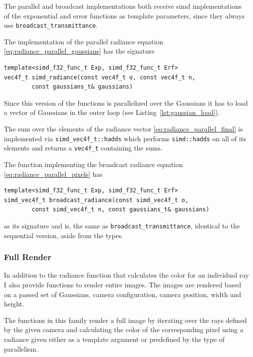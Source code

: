 \documentclass[a4paper, 11pt]{memoir}
\begin{document}
    The parallel and broadcast implementations both receive \gls{simd} implementations of the exponential and error
    functions as template parameters, since they always use \texttt{broadcast_transmittance}.

    The implementation of the parallel \gls{radiance} equation \eqref{eq:radiance_parallel_gaussians} has the signature
    \begin{verbatim}
template<simd_f32_func_t Exp, simd_f32_func_t Erf>
vec4f_t simd_radiance(const vec4f_t o, const vec4f_t n,
        const gaussians_t& gaussians)
    \end{verbatim}
    
    Since this version of the functions is parallelized over the Gaussians it has to load a vector of Gaussians in the
    outer loop (see Listing~\ref{lst:gaussian_load}).

    The sum over the elements of the \gls{radiance} vector \eqref{eq:radiance_parallel_final} is implemented via
    \texttt{simd_vec4f_t::hadds} which performs \texttt{simd::hadds} on all of its elements and returns
    a \texttt{vec4f_t} containing the sums.

    The function implementing the broadcast \gls{radiance} equation \eqref{eq:radiance_parallel_pixels} has
    \begin{verbatim}
template<simd_f32_func_t Exp, simd_f32_func_t Erf>
simd_vec4f_t broadcast_radiance(const simd_vec4f_t o,
        const simd_vec4f_t n, const gaussians_t& gaussians)
    \end{verbatim}
    as its signature and is, the same as \texttt{broadcast_transmittance}, identical to the sequential version,
    aside from the types.
    
    \subsubsection{Full Render}
    In addition to the radiance function that calculates the color for an individual ray I also provide functions to
    render entire images. The images are rendered based on a passed set of Gaussians, camera configuration, camera position,
    width and height.

    The functions in this family render a full image by iterating over the rays defined by the given camera and calculating
    the color of the corresponding pixel using a \gls{radiance} given either as a template argument or predefined by
    the type of parallelism.
\end{document}
